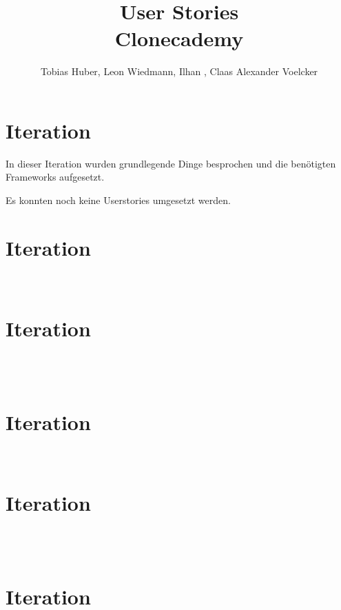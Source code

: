 \documentclass
[english,accentcolor=tud1c]
{tudreport}
\title{User Stories\\Clonecademy}
\author{Tobias Huber, Leon Wiedmann, Ilhan , Claas Alexander Voelcker}
\begin{document}

	\maketitle

	\chapter{Iteration}
	In dieser Iteration wurden grundlegende Dinge besprochen und die benötigten Frameworks aufgesetzt.

	Es konnten noch keine Userstories umgesetzt werden. 

	\chapter{Iteration}

	 \\
	


	\chapter{Iteration}

	 \\
	 \\
	


	\chapter{Iteration}

	 \\
	


	\chapter{Iteration}

	\\
	\\
	

	\chapter{Iteration}
\end{document}

